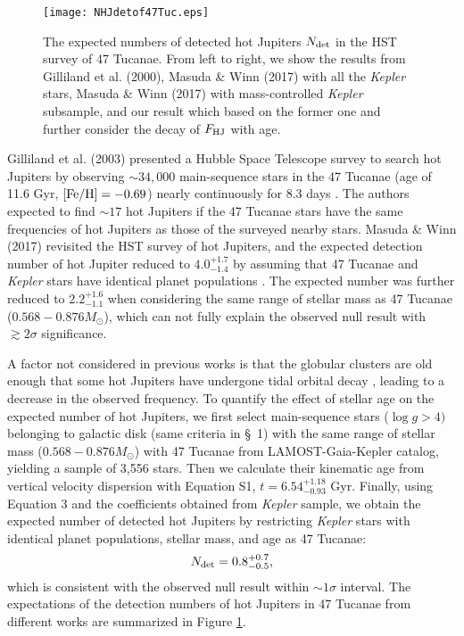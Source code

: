 \documentclass[twocolumn]{pnas-new}
\begin{document}
\begin{figure}[!t]
\centering
\texttt{[image: NHJdetof47Tuc.eps]}
\caption{The expected numbers of detected hot Jupiters $N_{\rm det}$ in the HST survey of 47 Tucanae.
From left to right, we show the results from Gilliland et al. (2000), Masuda \& Winn (2017) with all the {\it Kepler} stars, Masuda \& Winn (2017) with mass-controlled {\it Kepler} subsample, and our result which based on the former one and further consider the  decay of $F_{\rm HJ}$ with age.
\label{figNdet47Tuc}}
\end{figure}

Gilliland et al. (2003) presented a Hubble Space Telescope survey to search hot Jupiters by observing $\sim 34,000$ main-sequence stars in the 47 Tucanae (age of 11.6 Gyr,
$\rm [Fe/H] = -0.69$) nearly continuously for 8.3 days \citep{2003ApJ...585.1056G}.
The authors expected to find $\sim 17$ hot Jupiters if the 47 Tucanae stars have the same frequencies of hot Jupiters as those of the surveyed nearby stars.
Masuda \& Winn (2017) revisited the HST survey of hot Jupiters, and the expected detection number of hot Jupiter reduced to $4.0^{+1.7}_{-1.4}$ by assuming that 47 Tucanae and {\it Kepler} stars have identical planet populations \citep{2017AJ....153..187M}.
The expected number was further reduced to $2.2^{+1.6}_{-1.1}$ when considering the same range of stellar mass as 47 Tucanae ($0.568-0.876 M_\odot$), which can not fully explain the observed null result with $\gtrsim 2\sigma$ significance.


A factor not considered in previous works is that the globular clusters are old enough that some hot Jupiters have undergone tidal orbital decay \citep[e.g.,][]{2008ApJ...678.1396J,2009ApJ...698.1357J,2009ApJ...692L...9L}, leading to a decrease in the observed frequency.
To quantify the effect of stellar age on the expected number of hot Jupiters, we first select main-sequence stars ($\log g>4)$ belonging to galactic disk (same criteria in \S~1) with the same range of stellar mass ($0.568-0.876 M_\odot$) with 47 Tucanae from LAMOST-Gaia-Kepler catalog, yielding a sample of 3,556 stars.
Then we calculate their kinematic age from vertical velocity dispersion with Equation S1, $t=6.54^{+1.18}_{-0.93}$ Gyr.
Finally, using Equation 3 and the coefficients obtained from {\it Kepler} sample, we obtain the expected number of detected hot Jupiters by restricting {\it Kepler} stars with identical planet populations, stellar mass, and age as 47 Tucanae:
\begin{equation}
  N_{\rm det} = 0.8^{+0.7}_{-0.5},
\end{equation}
which is consistent with the observed null result within $\sim 1\sigma$ interval.
The expectations of the detection numbers of hot Jupiters in 47 Tucanae from different works are summarized in Figure \ref{figNdet47Tuc}.
\end{document}
